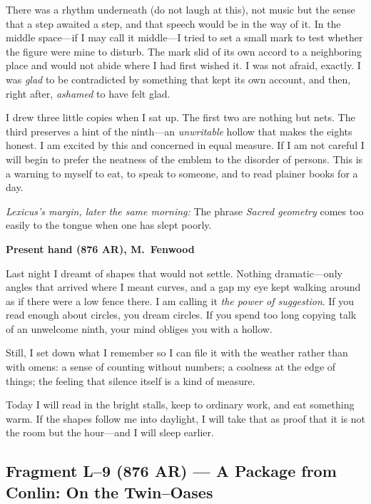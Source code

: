 \documentclass[11pt]{article}
\begin{document}
There was a rhythm underneath (do not laugh at this), not music but the sense that a step awaited a step, and that speech would be in the way of it. In the middle space—if I may call it middle—I tried to set a small mark to test whether the figure were mine to disturb. The mark slid of its own accord to a neighboring place and would not abide where I had first wished it. I was not afraid, exactly. I was \emph{glad} to be contradicted by something that kept its own account, and then, right after, \emph{ashamed} to have felt glad.

I drew three little copies when I sat up. The first two are nothing but nets. The third preserves a hint of the ninth—an \emph{unwritable} hollow that makes the eights honest. I am excited by this and concerned in equal measure. If I am not careful I will begin to prefer the neatness of the emblem to the disorder of persons. This is a warning to myself to eat, to speak to someone, and to read plainer books for a day.

\medskip
\noindent\textit{Lexicus’s margin, later the same morning:} The phrase \emph{Sacred geometry} comes too easily to the tongue when one has slept poorly.

\medskip
\noindent\textbf{Present hand (876 AR), M.\ Fenwood}

Last night I dreamt of shapes that would not settle. Nothing dramatic—only angles that arrived where I meant curves, and a gap my eye kept walking around as if there were a low fence there. I am calling it \emph{the power of suggestion}. If you read enough about circles, you dream circles. If you spend too long copying talk of an unwelcome ninth, your mind obliges you with a hollow.

Still, I set down what I remember so I can file it with the weather rather than with omens: a sense of counting without numbers; a coolness at the edge of things; the feeling that silence itself is a kind of measure.

Today I will read in the bright stalls, keep to ordinary work, and eat something warm. If the shapes follow me into daylight, I will take that as proof that it is not the room but the hour—and I will sleep earlier.

\subsection{Fragment L--9 (876 AR) --- A Package from Conlin: On the Twin--Oases}
\label{frag:l9}
{}
\end{document}
